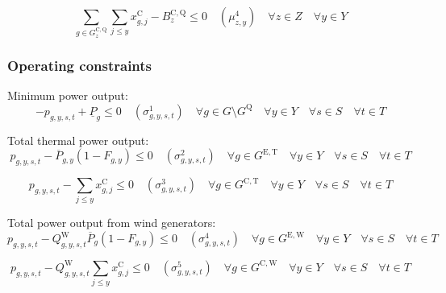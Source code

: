 \documentclass{article}
\newcommand{\sGenerators}{G}
\newcommand{\sGeneratorsExistingThermal}{G^{\mathrm{E,T}}}
\newcommand{\sGeneratorsExistingWind}{G^{\mathrm{E,W}}}
\newcommand{\sGeneratorsCandidateThermal}{G^{\mathrm{C,T}}}
\newcommand{\sGeneratorsCandidateWind}{G^{\mathrm{C,W}}}
\newcommand{\sStorage}{G^{\mathrm{Q}}}
\newcommand{\sStorageCandidate}{G^{\mathrm{C,Q}}}
\newcommand{\sYears}{Y}
\newcommand{\sScenarios}{S}
\newcommand{\sIntervals}{T}
\newcommand{\sZones}{Z}
\newcommand{\iGenerator}{g}
\newcommand{\iYear}{y}
\newcommand{\iYearAlias}{j}
\newcommand{\iScenario}{s}
\newcommand{\iInterval}{t}
\newcommand{\iZone}{z}
\newcommand{\cPowerOutputMax}[1][\iGenerator,\iYear]{\overline{P}_{#1}}
\newcommand{\cBuildLimitWind}{B^{\mathrm{C,\mathrm{W}}}_{\iZone}}
\newcommand{\cBuildLimitStorage}{B^{\mathrm{C,\mathrm{Q}}}_{\iZone}}
\newcommand{\cPowerOutputMin}[1][\iGenerator]{\underline{P}_{#1}}
\newcommand{\cCapacityFactorWind}[1][\iGenerator,\iYear,\iScenario,\iInterval]{Q_{#1}^{\mathrm{W}}}
\newcommand{\cRetirementIndicator}[1][\iGenerator,\iYear]{F_{#1}}
\newcommand{\vInstalledCapacity}[1][\iGenerator,\iYear]{x^{\mathrm{C}}_{#1}}
\newcommand{\vPower}[1][\iGenerator,\iYear,\iScenario,\iInterval]{p_{#1}}
\newcommand{\vInstalledCapacityTotal}[1][\iGenerator,\iYear]{a_{#1}}
\newcommand{\dWindBuildLimit}[1][\iZone,\iYear]{\mu_{#1}^{3}}
\newcommand{\dStorageBuildLimit}[1][\iZone,\iYear]{\mu_{#1}^{4}}
\newcommand{\dMinPowerOutput}[1][\iGenerator,\iYear,\iScenario,\iInterval]{\sigma_{#1}^{1}}
\newcommand{\dMaxPowerOutputExistingThermal}[1][\iGenerator,\iYear,\iScenario,\iInterval]{\sigma_{#1}^{2}}
\newcommand{\dMaxPowerOutputCandidateThermal}[1][\iGenerator,\iYear,\iScenario,\iInterval]{\sigma_{#1}^{3}}
\newcommand{\dMaxPowerOutputWindExisting}[1][\iGenerator,\iYear,\iScenario,\iInterval]{\sigma_{#1}^{4}}
\newcommand{\dMaxPowerOutputWindCandidate}[1][\iGenerator,\iYear,\iScenario,\iInterval]{\sigma_{#1}^{5}}
\newcommand{\sScenarioSets}{\quad \forall \iYear \in \sYears \quad \forall \iScenario \in \sScenarios \quad \forall \iInterval \in \sIntervals}
\begin{document}

\begin{equation}
	\sum\limits_{\iGenerator \in \sStorageCandidate_{\iZone}}  \sum\limits_{\iYearAlias \leq \iYear} \vInstalledCapacity[\iGenerator,\iYearAlias] - \cBuildLimitStorage \leq 0  \quad (\dStorageBuildLimit) \quad \forall \iZone \in \sZones \quad \forall \iYear \in \sYears
\end{equation}

\subsubsection{Operating constraints}
Minimum power output:
\begin{equation}
	-\vPower + \cPowerOutputMin \leq 0 \quad (\dMinPowerOutput) \quad \forall \iGenerator \in \sGenerators \setminus \sStorage \sScenarioSets
\end{equation}

Total thermal power output:
\begin{equation}
	\vPower - \cPowerOutputMax \left(1 - \cRetirementIndicator\right) \leq 0 \quad (\dMaxPowerOutputExistingThermal) \quad \forall \iGenerator \in \sGeneratorsExistingThermal \sScenarioSets
\end{equation}

\begin{equation}
	\vPower - \sum\limits_{\iYearAlias \leq \iYear} \vInstalledCapacity[\iGenerator,\iYearAlias] \leq 0 \quad (\dMaxPowerOutputCandidateThermal) \quad \forall \iGenerator \in \sGeneratorsCandidateThermal \sScenarioSets
\end{equation}

Total power output from wind generators:
\begin{equation}
	\vPower - \cCapacityFactorWind \cPowerOutputMax[\iGenerator] \left(1 - \cRetirementIndicator\right) \leq 0 \quad (\dMaxPowerOutputWindExisting) \quad \forall \iGenerator \in \sGeneratorsExistingWind \sScenarioSets
\end{equation}

\begin{equation}
	\vPower - \cCapacityFactorWind \sum\limits_{\iYearAlias \leq \iYear} \vInstalledCapacity[\iGenerator,\iYearAlias] \leq 0 \quad (\dMaxPowerOutputWindCandidate) \quad \forall \iGenerator \in \sGeneratorsCandidateWind \sScenarioSets
\end{equation}
\end{document}
